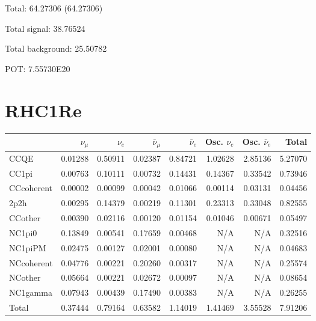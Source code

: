 \documentclass[10pt,a4paper]{article}
\begin{document}
Total: 64.27306    (64.27306)


Total signal: 38.76524


Total background: 25.50782

POT: 7.55730E20


\section*{RHC1Re}
\begin{tabular} { | l ||r | r | r | r | r | r | | r | }
\hline
              & $\nu_\mu$            & $\nu_e$              & $\bar{\nu}_{\mu}$    & $\bar{\nu}_{e}$      & Osc. $\nu_e$         & Osc. $\bar{\nu}_{e}$ & Total                \\ \hline\hline
 CCQE         & 0.01288              & 0.50911              & 0.02387              & 0.84721              & 1.02628              & 2.85136              & 5.27070              \\ \hline
 CC1pi        & 0.00763              & 0.10111              & 0.00732              & 0.14431              & 0.14367              & 0.33542              & 0.73946              \\ \hline
 CCcoherent   & 0.00002              & 0.00099              & 0.00042              & 0.01066              & 0.00114              & 0.03131              & 0.04456              \\ \hline
 2p2h         & 0.00295              & 0.14379              & 0.00219              & 0.11301              & 0.23313              & 0.33048              & 0.82555              \\ \hline
 CCother      & 0.00390              & 0.02116              & 0.00120              & 0.01154              & 0.01046              & 0.00671              & 0.05497              \\ \hline
 NC1pi0       & 0.13849              & 0.00541              & 0.17659              & 0.00468              & N/A                  & N/A                  & 0.32516              \\ \hline
 NC1piPM      & 0.02475              & 0.00127              & 0.02001              & 0.00080              & N/A                  & N/A                  & 0.04683              \\ \hline
 NCcoherent   & 0.04776              & 0.00221              & 0.20260              & 0.00317              & N/A                  & N/A                  & 0.25574              \\ \hline
 NCother      & 0.05664              & 0.00221              & 0.02672              & 0.00097              & N/A                  & N/A                  & 0.08654              \\ \hline
 NC1gamma     & 0.07943              & 0.00439              & 0.17490              & 0.00383              & N/A                  & N/A                  & 0.26255              \\ \hline
\hline
 Total        & 0.37444              & 0.79164              & 0.63582              & 1.14019              & 1.41469              & 3.55528              & 7.91206              \\ \hline

\end{tabular}
\end{document}
